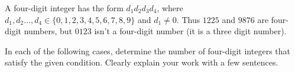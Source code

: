 \documentclass[12pt,fleqn,answers]{exam}
\begin{document}
\begin{questions} 


    \question A four-digit integer has the form $d_1 d_2 d_3 d_4$,
    where $d_1, d_2 \dots, d_4 \in \{0,1,2,3,4,5,6,7,8,9\}$ and $d_1 \neq 0$.  
    Thus $1225$ and $9876$ are four-digit numbers, but $0123$ isn't a four-digit number 
    (it is a three digit number).
    
    In each of the following cases, determine the number of four-digit integers 
    that satisfy the given condition. Clearly explain your work with a few sentences.



\end{questions}
\end{document}
